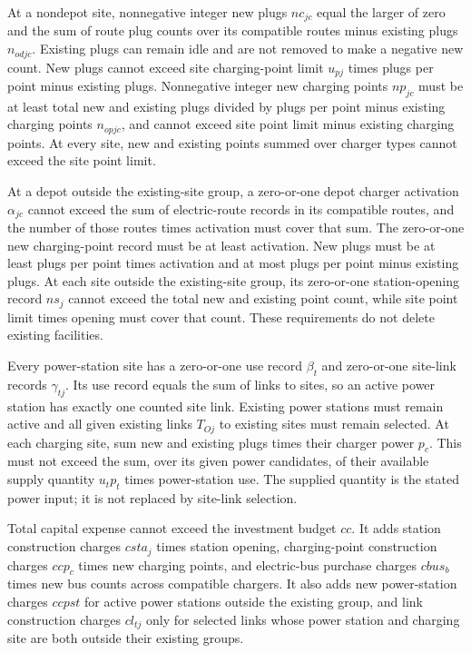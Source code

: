 \documentclass[10pt]{article}
\begin{document}
At a nondepot site, nonnegative integer new plugs $nc_{jc}$ equal the larger of zero and the sum of route plug counts over its compatible routes minus existing plugs $n_{odjc}$. Existing plugs can remain idle and are not removed to make a negative new count. New plugs cannot exceed site charging-point limit $u_{pj}$ times plugs per point minus existing plugs. Nonnegative integer new charging points $np_{jc}$ must be at least total new and existing plugs divided by plugs per point minus existing charging points $n_{opjc}$, and cannot exceed site point limit minus existing charging points. At every site, new and existing points summed over charger types cannot exceed the site point limit.

At a depot outside the existing-site group, a zero-or-one depot charger activation $\alpha_{jc}$ cannot exceed the sum of electric-route records in its compatible routes, and the number of those routes times activation must cover that sum. The zero-or-one new charging-point record must be at least activation. New plugs must be at least plugs per point times activation and at most plugs per point minus existing plugs. At each site outside the existing-site group, its zero-or-one station-opening record $ns_j$ cannot exceed the total new and existing point count, while site point limit times opening must cover that count. These requirements do not delete existing facilities.

Every power-station site has a zero-or-one use record $\beta_t$ and zero-or-one site-link records $\gamma_{tj}$. Its use record equals the sum of links to sites, so an active power station has exactly one counted site link. Existing power stations must remain active and all given existing links $T_{Oj}$ to existing sites must remain selected. At each charging site, sum new and existing plugs times their charger power $p_c$. This must not exceed the sum, over its given power candidates, of their available supply quantity $u_t p_t$ times power-station use. The supplied quantity is the stated power input; it is not replaced by site-link selection.

Total capital expense cannot exceed the investment budget $cc$. It adds station construction charges $csta_j$ times station opening, charging-point construction charges $ccp_c$ times new charging points, and electric-bus purchase charges $cbus_b$ times new bus counts across compatible chargers. It also adds new power-station charges $ccpst$ for active power stations outside the existing group, and link construction charges $cl_{tj}$ only for selected links whose power station and charging site are both outside their existing groups.
\end{document}
